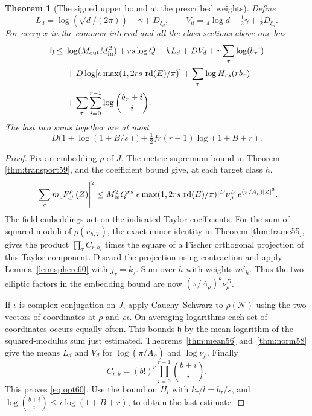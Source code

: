 \documentclass[a4paper,11pt]{article}
\newtheorem{theorem}[proposition]{Theorem}
\theoremstyle{definition}
\theoremstyle{remark}
\numberwithin{equation}{section}
\begin{document}
\begin{theorem}[The signed upper bound at the prescribed weights]\label{thm:opt60}
Define
\[
       L_d=\log(\sqrt d/(2\pi))-\gamma+D_{\xi_d},\qquad
       V_d=\tfrac14\log d-\tfrac12\gamma+\tfrac12D_{\xi_d}.
\]
For every \(x\) in the common interval and all the class sections
above one has
\begin{align}
 \mathfrak h\le {}&
       \log(M_{\rm out}M_{\rm in}^2)+rs\log Q
                              + k L_d+D V_d
                              +r\sum_\tau\log(b_\tau!)          \notag\\
  &+D\log\!\left[e\max(1,2rs\,\operatorname{rd}(E)/\pi)\right]
               +\sum_\tau\log H_{rs}(rb_\tau)                  \notag\\
  &+\sum_\tau\sum_{i=0}^{r-1}\log\binom{b_\tau+i}{i}.
                                                       \label{eq:opt60}
\end{align}
The last two sums together are at most
\[
 D\big(1+\log(1+B/s)\big)+\tfrac12fr(r-1)\log(1+B+r).
\]
\end{theorem}
\begin{proof}
Fix an embedding \(\rho\) of \(J\). The metric supremum bound in
Theorem \ref{thm:transport59}, and the coefficient bound give, at each
target class \(h\),
\[
 \left|\sum_c m_c F_{ch}^\rho(Z)\right|^2
 \le M_{\rm in}^2 Q^{rs}
     [e\max(1,2rs\,\operatorname{rd}(E)/\pi)]^D
            \nu_\rho^D\, e^{(\pi/A_\rho)|Z|^2}.
\]
The field embeddings act on the indicated Taylor coefficients.
For the sum of squared moduli of \(\rho(v_{h,T})\), the exact
minor identity in Theorem \ref{thm:frame55}, gives the product
\(\prod_\tau C_{r,b_\tau}\) times the square of a Fischer
orthogonal projection of this Taylor component. Discard the
projection using contraction and apply Lemma~\ref{lem:sphere60}
with \(j_\tau=k_\tau\). Sum over \(h\) with weights \(m'_h\).
Thus the two elliptic factors in the embedding bound are now
\((\pi/A_\rho)^k\nu_\rho^D\).

If \(\iota\) is complex conjugation on \(J\), apply
Cauchy--Schwarz to \(\rho(\mathcal N)\) using the two vectors of
coordinates at \(\rho\) and \(\rho\iota\). On averaging logarithms
each set of coordinates occurs equally often. This bounds
\(\mathfrak h\) by the mean logarithm of the squared-modulus sum
just estimated. Theorems~\ref{thm:mean56} and~\ref{thm:norm58}
give the means \(L_d\) and \(V_d\) for \(\log(\pi/A_\rho)\) and
\(\log\nu_\rho\). Finally
\[
       C_{r,b}=(b!)^r\prod_{i=0}^{r-1}\binom{b+i}{i}.
\]
This proves \eqref{eq:opt60}. Use the bound on \(H_l\) with
\(k_\tau/l=b_\tau/s\), and
\(\log\binom{b+i}{i}\le i\log(1+B+r)\), to obtain the last
estimate.
\end{proof}
\end{document}

